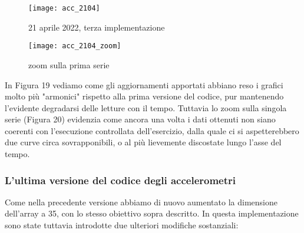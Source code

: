 \documentclass[fleqn,10pt]{SelfArx} %
\begin{document}
\begin{figure}[htb]\centering
	\texttt{[image: acc\_2104]}
	\caption{21 aprile 2022, terza implementazione}
	\label{fig:accelerazione 2104}
\end{figure}

\begin{figure}[htb]\centering
	\texttt{[image: acc\_2104\_zoom]}
	\caption{zoom sulla prima serie}
	\label{fig:zoom accelerazione 2104}
\end{figure}

In Figura 19 vediamo come gli aggiornamenti apportati abbiano reso i grafici molto più "armonici" rispetto alla prima versione 
del codice, pur mantenendo l'evidente degradarsi delle letture con il tempo.
Tuttavia lo zoom sulla singola serie (Figura 20) evidenzia come ancora una volta i dati ottenuti non siano coerenti con 
l'esecuzione controllata dell'esercizio, dalla quale ci si aspetterebbero due curve circa sovrapponibili, o al più lievemente 
discostate lungo l'asse del tempo.

\subsubsection{L'ultima versione del codice degli accelerometri}

Come nella precedente versione abbiamo di nuovo aumentato la dimensione dell'array a 35, con lo stesso obiettivo 
sopra descritto. In questa implementazione sono state tuttavia introdotte due ulteriori modifiche sostanziali:
\end{document}
